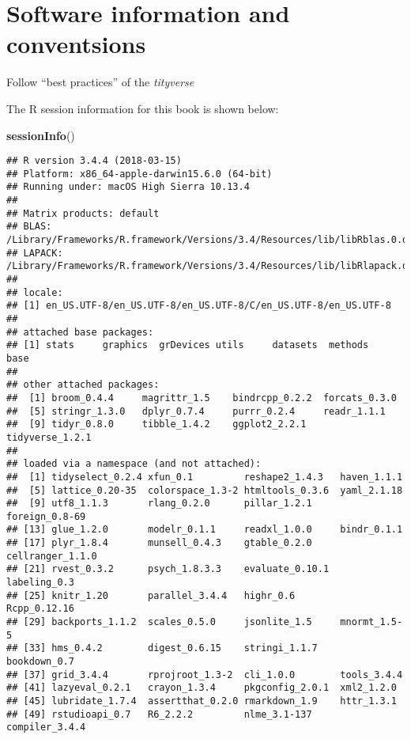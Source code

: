 \documentclass[]{book}
\newenvironment{Shaded}{\begin{snugshade}}{\end{snugshade}}
\newcommand{\KeywordTok}[1]{\textcolor[rgb]{0.13,0.29,0.53}{\textbf{#1}}}
\newcommand{\NormalTok}[1]{#1}
\theoremstyle{definition}
\theoremstyle{definition}
\theoremstyle{definition}
\theoremstyle{remark}
\begin{document}
\hypertarget{software-information-and-conventsions}{%
\section*{Software information and
conventsions}\label{software-information-and-conventsions}}

Follow ``best practices'' of the \emph{tityverse}

The R session information for this book is shown below:

\begin{Shaded}
\begin{Highlighting}[]
\KeywordTok{sessionInfo}\NormalTok{()}
\end{Highlighting}
\end{Shaded}

\begin{verbatim}
## R version 3.4.4 (2018-03-15)
## Platform: x86_64-apple-darwin15.6.0 (64-bit)
## Running under: macOS High Sierra 10.13.4
## 
## Matrix products: default
## BLAS: /Library/Frameworks/R.framework/Versions/3.4/Resources/lib/libRblas.0.dylib
## LAPACK: /Library/Frameworks/R.framework/Versions/3.4/Resources/lib/libRlapack.dylib
## 
## locale:
## [1] en_US.UTF-8/en_US.UTF-8/en_US.UTF-8/C/en_US.UTF-8/en_US.UTF-8
## 
## attached base packages:
## [1] stats     graphics  grDevices utils     datasets  methods   base     
## 
## other attached packages:
##  [1] broom_0.4.4     magrittr_1.5    bindrcpp_0.2.2  forcats_0.3.0  
##  [5] stringr_1.3.0   dplyr_0.7.4     purrr_0.2.4     readr_1.1.1    
##  [9] tidyr_0.8.0     tibble_1.4.2    ggplot2_2.2.1   tidyverse_1.2.1
## 
## loaded via a namespace (and not attached):
##  [1] tidyselect_0.2.4 xfun_0.1         reshape2_1.4.3   haven_1.1.1     
##  [5] lattice_0.20-35  colorspace_1.3-2 htmltools_0.3.6  yaml_2.1.18     
##  [9] utf8_1.1.3       rlang_0.2.0      pillar_1.2.1     foreign_0.8-69  
## [13] glue_1.2.0       modelr_0.1.1     readxl_1.0.0     bindr_0.1.1     
## [17] plyr_1.8.4       munsell_0.4.3    gtable_0.2.0     cellranger_1.1.0
## [21] rvest_0.3.2      psych_1.8.3.3    evaluate_0.10.1  labeling_0.3    
## [25] knitr_1.20       parallel_3.4.4   highr_0.6        Rcpp_0.12.16    
## [29] backports_1.1.2  scales_0.5.0     jsonlite_1.5     mnormt_1.5-5    
## [33] hms_0.4.2        digest_0.6.15    stringi_1.1.7    bookdown_0.7    
## [37] grid_3.4.4       rprojroot_1.3-2  cli_1.0.0        tools_3.4.4     
## [41] lazyeval_0.2.1   crayon_1.3.4     pkgconfig_2.0.1  xml2_1.2.0      
## [45] lubridate_1.7.4  assertthat_0.2.0 rmarkdown_1.9    httr_1.3.1      
## [49] rstudioapi_0.7   R6_2.2.2         nlme_3.1-137     compiler_3.4.4
\end{verbatim}
\end{document}
